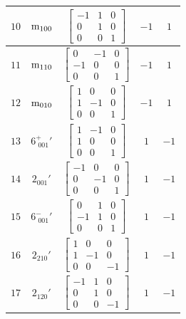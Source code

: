 \documentclass[fleqn,8pt]{jsarticle}
\begin{document}
\begin{longtable}{ccccc}
$ 10 $ & $ {\rm m}_{100} $ & $ \begin{bmatrix} -1 & 1 & 0 \\ 0 & 1 & 0 \\ 0 & 0 & 1 \end{bmatrix} $ & $ -1 $ & $ 1 $ \\ \hline
$ 11 $ & $ {\rm m}_{110} $ & $ \begin{bmatrix} 0 & -1 & 0 \\ -1 & 0 & 0 \\ 0 & 0 & 1 \end{bmatrix} $ & $ -1 $ & $ 1 $ \\ \hline
$ 12 $ & $ {\rm m}_{010} $ & $ \begin{bmatrix} 1 & 0 & 0 \\ 1 & -1 & 0 \\ 0 & 0 & 1 \end{bmatrix} $ & $ -1 $ & $ 1 $ \\ \hline
$ 13 $ & $ 6^{+}_{\,\,001}{}' $ & $ \begin{bmatrix} 1 & -1 & 0 \\ 1 & 0 & 0 \\ 0 & 0 & 1 \end{bmatrix} $ & $ 1 $ & $ -1 $ \\ \hline
$ 14 $ & $ 2{}_{001}{}' $ & $ \begin{bmatrix} -1 & 0 & 0 \\ 0 & -1 & 0 \\ 0 & 0 & 1 \end{bmatrix} $ & $ 1 $ & $ -1 $ \\ \hline
$ 15 $ & $ 6^{-}_{\,\,001}{}' $ & $ \begin{bmatrix} 0 & 1 & 0 \\ -1 & 1 & 0 \\ 0 & 0 & 1 \end{bmatrix} $ & $ 1 $ & $ -1 $ \\ \hline
$ 16 $ & $ 2{}_{210}{}' $ & $ \begin{bmatrix} 1 & 0 & 0 \\ 1 & -1 & 0 \\ 0 & 0 & -1 \end{bmatrix} $ & $ 1 $ & $ -1 $ \\ \hline
$ 17 $ & $ 2{}_{120}{}' $ & $ \begin{bmatrix} -1 & 1 & 0 \\ 0 & 1 & 0 \\ 0 & 0 & -1 \end{bmatrix} $ & $ 1 $ & $ -1 $ \\ \hline

\end{longtable}
\end{document}
